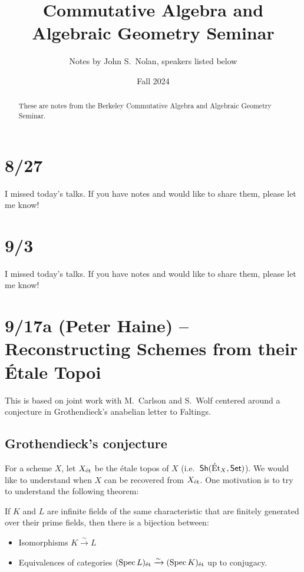 \documentclass{amsart}
\title{Commutative Algebra and Algebraic Geometry Seminar}
\author{Notes by John S.\ Nolan, speakers listed below}
\date{Fall 2024}
\begin{document}
\begin{abstract}
	These are notes from the Berkeley Commutative Algebra and Algebraic Geometry Seminar.
\end{abstract}

\maketitle

\tableofcontents

\section{8/27}

I missed today's talks.
If you have notes and would like to share them, please let me know!

\section{9/3}

I missed today's talks.
If you have notes and would like to share them, please let me know!

\section{9/17a (Peter Haine) -- Reconstructing Schemes from their \'Etale Topoi}

This is based on joint work with M.\ Carlson and S.\ Wolf centered around a conjecture in Grothendieck's anabelian letter to Faltings.

\subsection{Grothendieck's conjecture}

For a scheme $X$, let $X_{\mathrm{\acute{e}t}}$ be the \'etale topos of $X$ (i.e.\ $\mathsf{Sh}(\mathrm{\acute{E}t}_X, \mathsf{Set})$).
We would like to understand when $X$ can be recovered from $X_{\mathrm{\acute{e}t}}$.
One motivation is to try to understand the following theorem:

\begin{thm}
	If $K$ and $L$ are infinite fields of the same characteristic that are finitely generated over their prime fields, then there is a bijection between:
	\begin{itemize}
		\item Isomorphisms $K \xrightarrow{\sim} L$
		\item Equivalences of categories $(\operatorname{Spec} L)_{\mathrm{\acute{e}t}} \xrightarrow{\sim} (\operatorname{Spec} K)_{\mathrm{\acute{e}t}}$ up to conjugacy.
	\end{itemize}
\end{thm}
\end{document}
